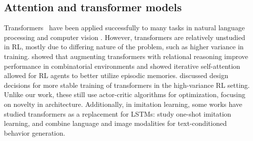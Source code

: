 \subsection{Attention and transformer models}
Transformers~\citep{vaswani2017attention} have been applied successfully to many tasks in natural language processing \citep{devlin2018bert,radford2018gpt} and computer vision \citep{carion2020detr,dosovitskiy2020vit}.
However, transformers are relatively unstudied in RL, mostly due to differing nature of the problem, such as higher variance in training.
\citet{zambaldi2018deep} showed that augmenting transformers with relational reasoning improve performance in combinatorial environments and \citet{ritter2020epn} showed iterative self-attention allowed for RL agents to better utilize episodic memories.
\citet{parisotto2020stabilizing} discussed design decisions for more stable training of transformers in the high-variance RL setting.
Unlike our work, these still use actor-critic algorithms for optimization, focusing on novelty in architecture.
Additionally, in imitation learning, some works have studied transformers as a replacement for LSTMs: \citet{dasari2020transformers} study one-shot imitation learning, and \citet{abramson2020imitating} combine language and image modalities for text-conditioned behavior generation.
